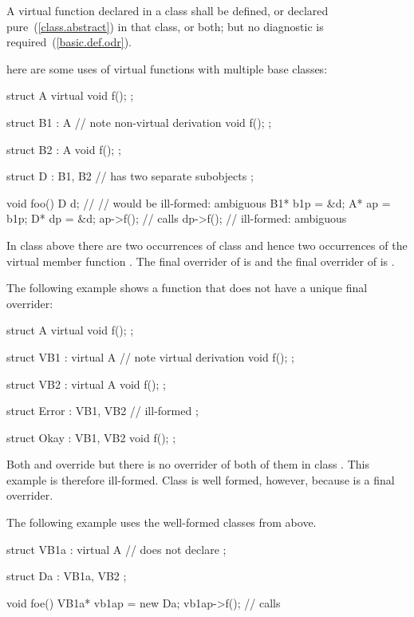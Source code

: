 \pnum
{}%
A virtual function declared in a class shall be defined, or declared
pure~(\ref{class.abstract}) in that class, or both; but no diagnostic is
required~(\ref{basic.def.odr}).
%

\pnum
{}%
\enterexample
here are some uses of virtual functions with multiple base classes:
%
\begin{codeblock}
struct A {
    virtual void f();
};

struct B1 : A {                 // note non-virtual derivation
    void f();
};

struct B2 : A {
    void f();
};

struct D : B1, B2 {             //  has two separate  subobjects
};

void foo()
{
    D   d;
 //                   // would be ill-formed: ambiguous
    B1*  b1p = &d;
    A*   ap = b1p;
    D*   dp = &d;
    ap->f();                    // calls 
    dp->f();                    // ill-formed: ambiguous
}
\end{codeblock}
In class  above there are two occurrences of class 
and hence two occurrences of the virtual member function .
The final overrider of  is  and the final
overrider of  is .

\pnum
The following example shows a function that does not have a unique final
overrider:
\begin{codeblock}
struct A {
    virtual void f();
};

struct VB1 : virtual A {        // note virtual derivation
    void f();
};

struct VB2 : virtual A {
    void f();
};

struct Error : VB1, VB2 {       // ill-formed
};

struct Okay : VB1, VB2 {
    void f();
};
\end{codeblock}
Both  and  override  but there
is no overrider of both of them in class . This example is
therefore ill-formed. Class  is well formed, however,
because  is a final overrider.

\pnum
The following example uses the well-formed classes from above.
\begin{codeblock}
struct VB1a : virtual A {       // does not declare 
};

struct Da : VB1a, VB2 {
};

void foe()
{
    VB1a*  vb1ap = new Da;
    vb1ap->f();                 // calls 
}
\end{codeblock}
\exitexampleb

